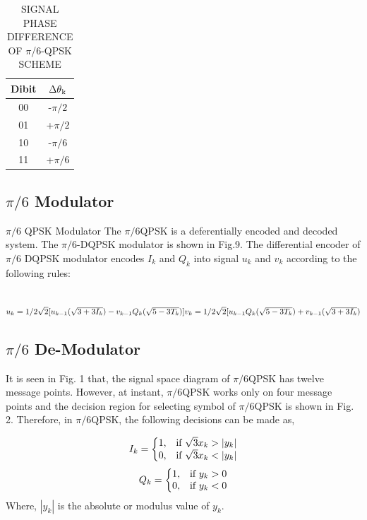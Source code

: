 \documentclass[conference]{IEEEtran}
\begin{document}
\begin{table}[]
\centering
\begin{tabular}{|c|c|}
\hline
\textbf{Dibit} & \textbf{$\Delta\theta\textsubscript{k}$} \\ \hline
00 & -$\pi/2$ \\ \hline
01 & +$\pi/2$ \\ \hline
10 & -$\pi/6$ \\ \hline
11 & +$\pi/6$ \\ \hline
\end{tabular}
\bigskip
\caption{ SIGNAL PHASE DIFFERENCE OF $\pi$/6-QPSK SCHEME}
\end{table}

\subsection{$\pi/6$ Modulator}
$\pi/6$ QPSK Modulator
The $\pi/6$QPSK is a deferentially encoded and decoded system.
The $\pi/6$-DQPSK modulator is shown in Fig.9. The differential
encoder of $\pi/6$ DQPSK modulator encodes $I_{k}$ and $Q_{k}$ into
signal $u_{k}$ and $v_{k}$ according to the following rules:

\\

\begin{math}



    u_{k} = 1/2\sqrt{2}[u_{k-1}(\sqrt{3+3I_{k}})-v_{k-1}Q_{k}(\sqrt{5-3T_{k}})]
    \\

    v_{k} = 1/2\sqrt{2}[u_{k-1}Q_{k}(\sqrt{5-3T_{k}})+v_{k-1}(\sqrt{3+3I_{k}})

\end{math}

\subsection{$\pi/6$ De-Modulator}

It is seen in Fig. 1 that, the signal space diagram of $\pi/6$QPSK
has twelve message points. However, at instant, $\pi/6$QPSK
works only on four message points and the decision region for
selecting symbol of $\pi/6$QPSK is shown in Fig. 2. Therefore,
in $\pi/6$QPSK, the following decisions can be made as,

\begin{equation}
  I_{k}=\left\{
  \begin{array}{@{}ll@{}}
    1, & \text{if}\ \sqrt{3}x_{k}>|y_{k}| \\
    0, & \text{if}\ \sqrt{3}x_{k}<|y_{k}|
  \end{array}\right.
\end{equation} 
\begin{equation}
    Q_{k}=\left\{
  \begin{array}{@{}ll@{}}
    1, & \text{if}\ y_{k}>0 \\
    0, & \text{if}\ y_{k}<0
  \end{array}\right.
\end{equation}
Where, $|y_{k}|$ is the absolute or modulus value of $y_{k}$.
\end{document}
